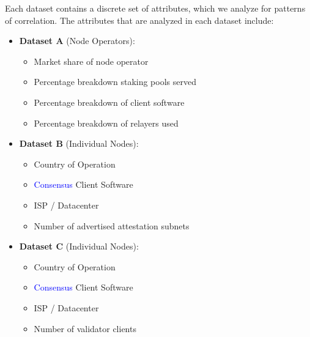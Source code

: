 \documentclass[conference]{IEEEtran}
\newcommand{\leo}[1]{\textcolor{blue}{#1}}
\begin{document}
Each dataset contains a discrete set of attributes, which we analyze for patterns of correlation.  The attributes that are analyzed in each dataset include:

\begin{itemize}
    \item \textbf{Dataset A} (Node Operators):
    \begin{itemize}
        \item Market share of node operator
        \item Percentage breakdown staking pools served
        \item Percentage breakdown of client software
        \item Percentage breakdown of relayers used
    \end{itemize}
    \item \textbf{Dataset B} (Individual Nodes):
            \begin{itemize}
                \item Country of Operation
                \item \leo{Consensus} Client Software
                \item ISP / Datacenter
                \item Number of advertised attestation subnets
            \end{itemize}
    \item \textbf{Dataset C} (Individual Nodes):
            \begin{itemize}
                \item Country of Operation
                \item \leo{Consensus} Client Software
                \item ISP / Datacenter
                \item Number of validator clients
            \end{itemize}
\end{itemize}
\end{document}
